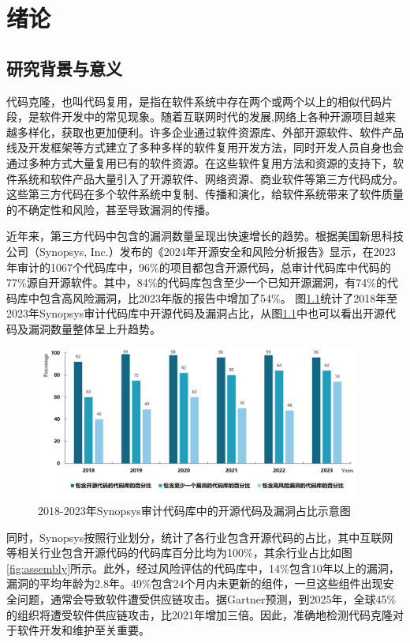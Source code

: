\chapter{绪论}
\label{chap:intro}

\section{研究背景与意义}
\label{sec:background}
代码克隆，也叫代码复用，是指在软件系统中存在两个或两个以上的相似代码片段\cite{乐乔艺2021代码克隆检测研究进展综述}，是软件开发中的常见现象。随着互联网时代的发展,网络上各种开源项目越来越多样化，获取也更加便利。许多企业通过软件资源库、外部开源软件、软件产品线及开发框架等方式建立了多种多样的软件复用开发方法，同时开发人员自身也会通过多种方式大量复用已有的软件资源。在这些软件复用方法和资源的支持下，软件系统和软件产品大量引入了开源软件、网络资源、商业软件等第三方代码成分。这些第三方代码在多个软件系统中复制、传播和演化，给软件系统带来了软件质量的不确定性和风险，甚至导致漏洞的传播\cite{JSJY20230911009}。

近年来，第三方代码中包含的漏洞数量呈现出快速增长的趋势。根据美国新思科技公司（Synopsys, Inc.）发布的《2024年开源安全和风险分析报告》\cite{Synopsys_2024}显示，在2023年审计的1067个代码库中，96\%的项目都包含开源代码，总审计代码库中代码的77\%源自开源软件。其中，84\%的代码库包含至少一个已知开源漏洞，有74\%的代码库中包含高风险漏洞，比2023年版的报告中增加了54\%。
图\ref{fig:Proportion}统计了2018年至2023年Synopsys审计代码库中开源代码及漏洞占比，从图\ref{fig:Proportion}中也可以看出开源代码及漏洞数量整体呈上升趋势。

\begin{figure}[H]
    \centering
    \includegraphics[width=0.95\textwidth]{figures/Proportion}
    \caption{2018-2023年Synopsys审计代码库中的开源代码及漏洞占比示意图}\label{fig:Proportion}
\end{figure}

同时，Synopsys按照行业划分，统计了各行业包含开源代码的占比，其中互联网等相关行业包含开源代码的代码库百分比均为100\%，其余行业占比如图\ref{fig:assembly}所示。此外，经过风险评估的代码库中，14\%包含10年以上的漏洞，漏洞的平均年龄为2.8年。49\%包含24个月内未更新的组件，一旦这些组件出现安全问题，通常会导致软件遭受供应链攻击。据Gartner\cite{Gartner_2022}预测，到2025年，全球45\%的组织将遭受软件供应链攻击，比2021年增加三倍。因此，准确地检测代码克隆对于软件开发和维护至关重要。

